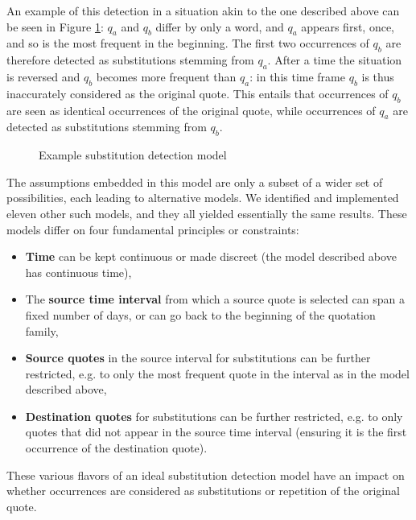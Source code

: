 An example of this detection in a situation akin to the one described above can be seen in Figure \ref{fig:substitution-detection-example}: $q_a$ and $q_b$ differ by only a word, and $q_a$ appears first, once, and so is the most frequent in the beginning.
The first two occurrences of $q_b$ are therefore detected as substitutions stemming from $q_a$.
After a time the situation is reversed and $q_b$ becomes more frequent than $q_a$: in this time frame $q_b$ is thus inaccurately considered as the original quote.
This entails that occurrences of $q_b$ are seen as identical occurrences of the original quote, while occurrences of $q_a$ are detected as substitutions stemming from $q_b$.

\begin{figure}[h]
    \centering
    \def\svgwidth{\linewidth}
    \small
    
    \caption{Example substitution detection model}
    \label{fig:substitution-detection-example}
\end{figure}

The assumptions embedded in this model are only a subset of a wider set of possibilities, each leading to alternative models.
We identified and implemented eleven other such models, and they all yielded essentially the same results.
These models differ on four fundamental principles or constraints:

\begin{itemize}
    \item \textbf{Time} can be kept continuous or made discreet (the model described above has continuous time),
    \item The \textbf{source time interval} from which a source quote is selected can span a fixed number of days, or can go back to the beginning of the quotation family,
    \item \textbf{Source quotes} in the source interval for substitutions can be further restricted, e.g. to only the most frequent quote in the interval as in the model described above,
    \item \textbf{Destination quotes} for substitutions can be further restricted, e.g. to only quotes that did not appear in the source time interval (ensuring it is the first occurrence of the destination quote).
\end{itemize}

These various flavors of an ideal substitution detection model %
 have an impact on whether occurrences are considered as substitutions or repetition of the original quote. %

